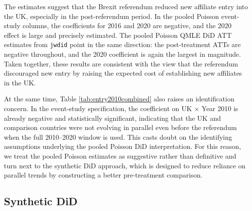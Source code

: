 \documentclass[preprint,11pt,authoryear]{elsarticle}
\begin{document}
The estimates suggest that the Brexit referendum reduced new affiliate entry into the UK, especially in the post-referendum period. In the pooled Poisson event-study columns, the coefficients for 2016 and 2020 are negative, and the 2020 effect is large and precisely estimated. The pooled Poisson QMLE DiD ATT estimates from \texttt{jwdid} point in the same direction: the post-treatment ATTs are negative throughout, and the 2020 coefficient is again the largest in magnitude. Taken together, these results are consistent with the view that the referendum discouraged new entry by raising the expected cost of establishing new affiliates in the UK.

At the same time, Table \ref{tab:entry2010combined} also raises an identification concern. In the event-study specification, the coefficient on UK $\times$ Year 2010 is already negative and statistically significant, indicating that the UK and comparison countries were not evolving in parallel even before the referendum when the full 2010--2020 window is used. This casts doubt on the identifying assumptions underlying the pooled Poisson DiD interpretation. For this reason, we treat the pooled Poisson estimates as suggestive rather than definitive and turn next to the synthetic DiD approach, which is designed to reduce reliance on parallel trends by constructing a better pre-treatment comparison.


{\renewcommand\normalsize{\scriptsize}%
\normalsize 

}



\subsection{Synthetic DiD} \label{sec:SDiD-entry}
\end{document}
